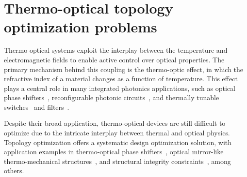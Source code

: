 \chapter{Thermo-optical topology optimization problems}\label{chap:to}
Thermo-optical systems exploit the interplay between the temperature and electromagnetic fields to enable active control over optical properties. 
The primary mechanism behind this coupling is the thermo-optic effect, 
in which the refractive index of a material changes as a function of temperature. 
This effect plays a central role in many integrated photonics applications, such as
 optical phase shifters~\cite{TOPS_1, TOPS_2, TOPS_3}, reconfigurable photonic circuits~\cite{program, PIC}, and thermally tunable switches~\cite{switch, switch_2} and filters~\cite{filter}.

 Despite their broad application, thermo-optical devices are still difficult to optimize due to the intricate interplay between thermal and optical physics.
  Topology optimization offers a systematic design optimization solution, with application examples in
 thermo-optical phase shifters~\cite{TOPS_heat, ownpub0}, optical mirror-like thermo-mechanical structures~\cite{opt_perf}, and
structural integrity constraints~\cite{structural_heat}, among others.


